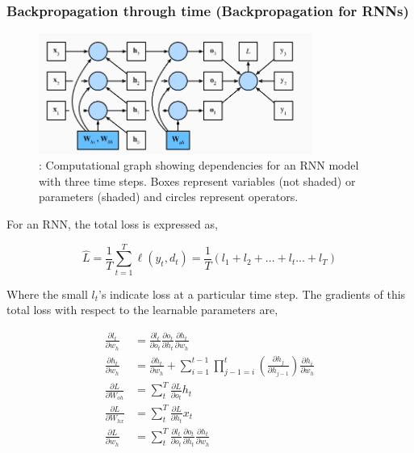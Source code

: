 \documentclass[12pt, letterpaper]{article}
\begin{document}
\subsubsection{Backpropagation through time (Backpropagation for RNNs)}

\begin{figure}[htpb]
    \centering
    \includegraphics[width=0.8\textwidth]{d2l_ai_rnn_v2.png}
    \caption{\cite{zhang2023dive}: Computational graph showing dependencies for an RNN model 
    with three time steps. Boxes represent variables (not shaded) or parameters (shaded) and circles 
    represent operators.}
    \label{fig: rnns v2}
\end{figure}


For an RNN, the total loss is expressed as,

\begin{equation}
    \hat{L} = \frac{1}{T} \sum_{t=1}^{T} \ell(y_t, d_t) = \frac{1}{T} (l_1 + l_2 + ... + l_t ... + l_T)
    \label{eqn: total loss rnn}
\end{equation}

Where the small $l_t$'s indicate loss at a particular time step. The gradients of this total loss with respect
to the learnable parameters are, 

\begin{align}
    \frac{\partial l_t}{\partial w_h} &= \frac{\partial l_t}{\partial o_t}\frac{\partial o_t}{\partial h_t}\frac{\partial h_t}{\partial w_h} \label{eqn: rnn lt wrt w_h}\\
    \frac{\partial h_t}{\partial w_h} &= \frac{\partial h_t}{\partial w_h} + \sum_{i=1}^{t-1}\prod_{j-1=i}^{t} (\frac{\partial h_j}{\partial h_{j-1}}) \frac{\partial h_i}{\partial w_h}\label{eqn: rnn h_t wrt w_h}\\
    \frac{\partial L}{\partial W_{oh}} &= \sum_{t}^{T} \frac{\partial L}{\partial o_t} h_t \\
    \frac{\partial L}{\partial W_{hx}} &= \sum_{t}^{T} \frac{\partial L}{\partial h_t} x_t \\
    \frac{\partial L}{\partial w_h} &= \sum_{t}^T \frac{\partial l_t}{\partial o_t}\frac{\partial o_t}{\partial h_t}\frac{\partial h_t}{\partial w_h} \label{eqn: rnn total loss wrt w_h}
\end{align}
\end{document}
